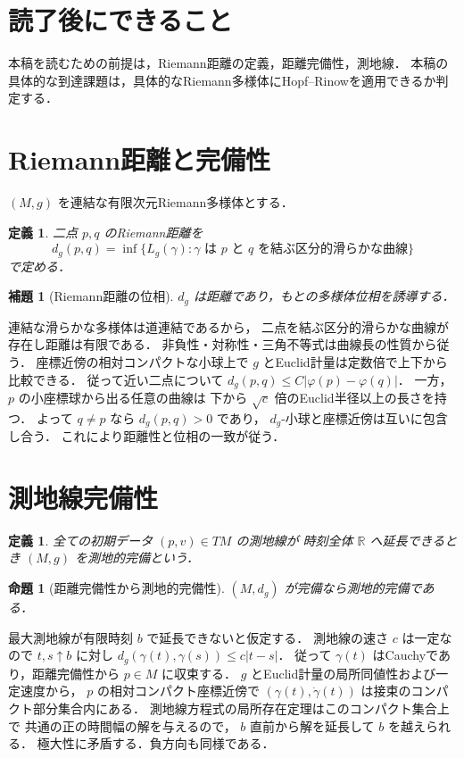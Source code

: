 \documentclass[a5paper,10pt,onecolumn]{jsarticle}
\makeatletter
\theoremstyle{mathnotetheorem}
\newtheorem{definition}[theorem]{定義}
\newtheorem{lemma}[theorem]{補題}
\newtheorem{proposition}[theorem]{命題}
\renewcommand{\proofname}{証明}
\renewenvironment{proof}[1][\proofname]{%
  \par\pushQED{\qed}\normalfont\topsep4\p@\@plus2\p@\relax
  \trivlist\item[\hskip\labelsep\bfseries #1]\ignorespaces
}{\popQED\endtrivlist\@endpefalse}
\makeatother
\begin{document}
\section*{読了後にできること}
本稿を読むための前提は，Riemann距離の定義，距離完備性，測地線．
本稿の具体的な到達課題は，具体的なRiemann多様体にHopf--Rinowを適用できるか判定する．


\section{Riemann距離と完備性}
$(M,g)$ を連結な有限次元Riemann多様体とする．
\begin{definition}
二点 $p,q$ のRiemann距離を
\[
 d_g(p,q)=\inf\{L_g(\gamma):\gamma
 \text{ は }p\text{ と }q\text{ を結ぶ区分的滑らかな曲線}\}
\]
で定める．
\end{definition}
\begin{lemma}[Riemann距離の位相]
$d_g$ は距離であり，もとの多様体位相を誘導する．
\end{lemma}
\begin{proof}
連結な滑らかな多様体は道連結であるから，
二点を結ぶ区分的滑らかな曲線が存在し距離は有限である．
非負性・対称性・三角不等式は曲線長の性質から従う．
座標近傍の相対コンパクトな小球上で
$g$ とEuclid計量は定数倍で上下から比較できる．
従って近い二点について
$d_g(p,q)\le C|\varphi(p)-\varphi(q)|$．
一方，$p$ の小座標球から出る任意の曲線は
下から $\sqrt c$ 倍のEuclid半径以上の長さを持つ．
よって $q\ne p$ なら $d_g(p,q)>0$ であり，
$d_g$-小球と座標近傍は互いに包含し合う．
これにより距離性と位相の一致が従う．
\end{proof}
\section{測地線完備性}
\begin{definition}
全ての初期データ $(p,v)\in TM$ の測地線が
時刻全体 $\mathbb R$ へ延長できるとき
$(M,g)$ を測地的完備という．
\end{definition}
\begin{proposition}[距離完備性から測地的完備性]
$(M,d_g)$ が完備なら測地的完備である．
\end{proposition}
\begin{proof}
最大測地線が有限時刻 $b$ で延長できないと仮定する．
測地線の速さ $c$ は一定なので
$t,s\uparrow b$ に対し
$d_g(\gamma(t),\gamma(s))\le c|t-s|$．
従って $\gamma(t)$ はCauchyであり，距離完備性から
$p\in M$ に収束する．
$g$ とEuclid計量の局所同値性および一定速度から，
$p$ の相対コンパクト座標近傍で
$(\gamma(t),\dot\gamma(t))$ は接束のコンパクト部分集合内にある．
測地線方程式の局所存在定理はこのコンパクト集合上で
共通の正の時間幅の解を与えるので，
$b$ 直前から解を延長して $b$ を越えられる．
極大性に矛盾する．負方向も同様である．
\end{proof}
\end{document}

